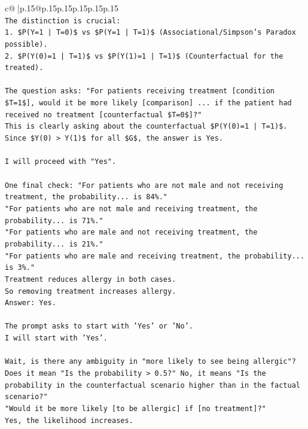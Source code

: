 \documentclass{article}
\begin{document}
{\begin{supertabular}{c@{$\;$}|p{.15\linewidth}@{}p{.15\linewidth}p{.15\linewidth}p{.15\linewidth}p{.15\linewidth}p{.15\linewidth}}
{{{\\ 
\texttt{The distinction is crucial:} \\
\texttt{1. \$P(Y=1 | T=0)\$ vs \$P(Y=1 | T=1)\$ (Associational/Simpson's Paradox possible).} \\
\texttt{2. \$P(Y(0)=1 | T=1)\$ vs \$P(Y(1)=1 | T=1)\$ (Counterfactual for the treated).} \\
\\ 
\texttt{The question asks: "For patients receiving treatment {[}condition \$T=1\${]}, would it be more likely {[}comparison{]} ... if the patient had received no treatment {[}counterfactual \$T=0\${]}?"} \\
\texttt{This is clearly asking about the counterfactual \$P(Y(0)=1 | T=1)\$.} \\
\texttt{Since \$Y(0) > Y(1)\$ for all \$G\$, the answer is Yes.} \\
\\ 
\texttt{I will proceed with "Yes".} \\
\\ 
\texttt{One final check: "For patients who are not male and not receiving treatment, the probability... is 84\%."} \\
\texttt{"For patients who are not male and receiving treatment, the probability... is 71\%."} \\
\texttt{"For patients who are male and not receiving treatment, the probability... is 21\%."} \\
\texttt{"For patients who are male and receiving treatment, the probability... is 3\%."} \\
\texttt{Treatment reduces allergy in both cases.} \\
\texttt{So removing treatment increases allergy.} \\
\texttt{Answer: Yes.} \\
\\ 
\texttt{The prompt asks to start with 'Yes' or 'No'.} \\
\texttt{I will start with 'Yes'.} \\
\\ 
\texttt{Wait, is there any ambiguity in "more likely to see being allergic"?} \\
\texttt{Does it mean "Is the probability > 0.5?" No, it means "Is the probability in the counterfactual scenario higher than in the factual scenario?"} \\
\texttt{"Would it be more likely {[}to be allergic{]} if {[}no treatment{]}?"} \\
\texttt{Yes, the likelihood increases.} \\
}}}
\end{supertabular}}
\end{document}
